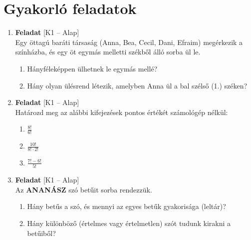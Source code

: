 \documentclass[12pt,a4paper]{article}
\begin{document}
\newpage

\section*{Gyakorló feladatok}

\begin{enumerate}[label=\arabic*., leftmargin=*]
    
    \item \textbf{Feladat} \textsf{\small [K1 – Alap]} \\
    Egy öttagú baráti társaság (Anna, Bea, Cecil, Dani, Efraim) megérkezik a színházba, és egy öt egymás melletti székből álló sorba ül le.
    \begin{enumerate}[label=\alph*)]
        \item Hányféleképpen ülhetnek le egymás mellé?
        \item Hány olyan ülésrend létezik, amelyben Anna ül a bal szélső (1.) széken?
    \end{enumerate}

    \vspace{0.4cm}

    \item \textbf{Feladat} \textsf{\small [K1 – Alap]} \\
    Határozd meg az alábbi kifejezések pontos értékét számológép nélkül:
    \begin{enumerate}[label=\alph*)]
        \item $\frac{8!}{6!}$
        \item $\frac{10!}{8! \cdot 2!}$
        \item $\frac{7! - 6!}{5!}$
    \end{enumerate}

    \vspace{0.4cm}

    \item \textbf{Feladat} \textsf{\small [K1 – Alap]} \\
    Az \textbf{ANANÁSZ} szó betűit sorba rendezzük. 
    \begin{enumerate}[label=\alph*)]
        \item Hány betűs a szó, és mennyi az egyes betűk gyakorisága (leltár)?
        \item Hány különböző (értelmes vagy értelmetlen) szót tudunk kirakni a betűiből?
    \end{enumerate}

    \vspace{0.4cm}


\end{enumerate}
\end{document}
